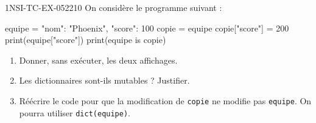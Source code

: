 \begin{exercice}{1NSI-TC-EX-052}{2}{10}
On considère le programme suivant :
\begin{python}
equipe = {"nom": "Phoenix", "score": 100}
copie = equipe
copie["score"] = 200
print(equipe["score"])
print(equipe is copie)
\end{python}
\begin{enumerate}
  \item Donner, sans exécuter, les deux affichages.
  \item Les dictionnaires sont-ils mutables ? Justifier.
  \item Réécrire le code pour que la modification de \lstinline{copie} ne modifie
        pas \lstinline{equipe}. On pourra utiliser \lstinline{dict(equipe)}.
\end{enumerate}
\end{exercice}
